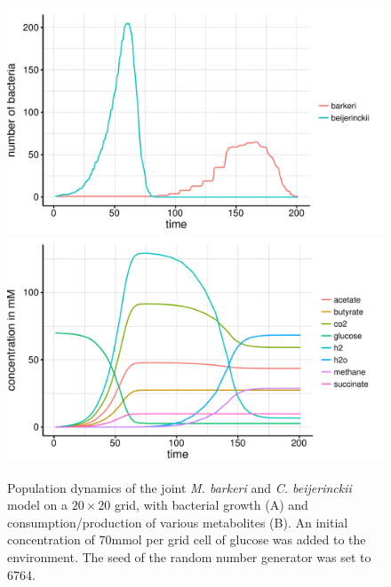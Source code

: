 \begin{figure}[h!]
  \centering
    \includegraphics[scale=0.45]{../results/barkeri_beijerinckii_20x20_seed6764_growth.pdf}
    \includegraphics[scale=0.45]{../results/barkeri_beijerinckii_20x20_seed6764_subs.pdf}
  \caption{Population dynamics of the joint \emph{M. barkeri} and \emph{C. beijerinckii} model on a $20\times20$ grid, with bacterial growth (A) and consumption/production of various metabolites (B). An initial concentration of 70\;mmol per grid cell of glucose was added to the environment. The seed of the random number generator was set to 6764.}
  \label{fig:cbsg}
\end{figure}
